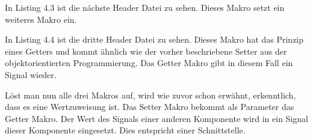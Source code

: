
In Listing 4.3 ist die nächste Header Datei zu sehen. Dieses Makro setzt ein weiteres Makro ein.

In Listing 4.4 ist die dritte Header Datei zu sehen. Dieses Makro hat das Prinzip eines Getters und kommt ähnlich
wie der vorher beschriebene Setter aus der objektorientierten Programmierung. Das Getter Makro gibt 
in diesem Fall ein Signal wieder.




Löst man nun alle drei Makros auf, wird wie zuvor schon erwähnt, erkenntlich, dass es eine Wertzuweisung ist. Das Setter Makro bekommt
als Parameter das Getter Makro. Der Wert
des Signals einer anderen Komponente wird in ein Signal dieser Komponente eingesetzt. Dies entspricht einer Schnittstelle.





